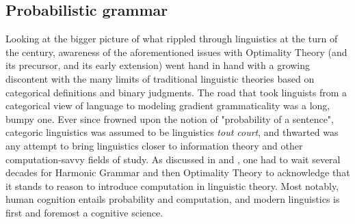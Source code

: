 \subsection{Probabilistic grammar}  %
Looking at the bigger picture of what rippled through linguistics at the turn of the century, awareness of the aforementioned issues with Optimality Theory (and its precursor, and its early extension) went hand in hand with a growing discontent with the many limits of traditional linguistic theories based on categorical definitions and binary judgments. The road that took linguists from a categorical view of language to modeling gradient grammaticality was a long, bumpy one. Ever since \textcite{chomsky1957syntactic} frowned upon the notion of "probability of a sentence", categoric linguistics was assumed to be linguistics \textit{tout court}, and thwarted was any attempt to bring linguistics closer to information theory and other computation-savvy fields of study. As discussed in  and , one had to wait several decades for Harmonic Grammar and then Optimality Theory to acknowledge that it stands to reason to introduce computation in linguistic theory. Most notably, human cognition entails probability and computation, and modern linguistics is first and foremost a cognitive science.\\
